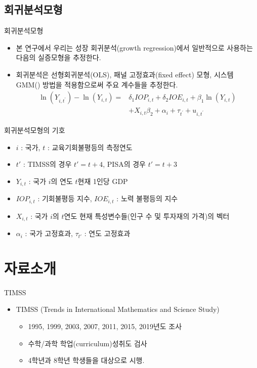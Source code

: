 \documentclass[handout, 10pt]{beamer}
\begin{document}
\subsection{회귀분석모형}
\begin{frame}{회귀분석모형}
   \begin{itemize}
       \item  본 연구에서 우리는 성장 회귀분석(growth regression)에서 일반적으로 사용하는 다음의 실증모형을 추정한다.
       \item 회귀분석은 선형회귀분석(OLS), 패널 고정효과(fixed effect) 모형, 시스템 GMM(\cite{bnb98}) 방법을 적용함으로써 주요 계수들을 추정한다.
       \begin{equation}
            \begin{aligned}
            \ln \left(Y_{i, t^{\prime}}\right)-\ln \left(Y_{i, t}\right)=& \delta_{1} I O P_{i, t}+\delta_{2} I O E_{i, t}+\beta_{1} \ln \left(Y_{i, t}\right) \\
            &+X_{i, t} \beta_{2} +\alpha_{i}+\tau_{t^{\prime}}+u_{i, t^{\prime}}
            \end{aligned}
            \label{eq:regbase}
       \end{equation} 
   \end{itemize} 
\end{frame}
 
\begin{frame}{회귀분석모형의 기호}
   \begin{itemize}
        \item $i$ : 국가, $t$ : 교육기회불평등의 측정연도
        \item $t'$ : TIMSS의 경우 $t'=t+4$, PISA의 경우  $t'=t+3$
        \item $Y_{i,t}$ : 국가 $i$의 연도 $t$현재 1인당 GDP
        \item $IOP_{i,t}$ : 기회불평등 지수, $IOE_{i,t}$ : 노력 불평등의 지수
        \item $X_{i,t}$ : 국가 $i$의 $t$연도 현재 특성변수들(인구 수 및 투자재의 가격)의 벡터 
        \item $\alpha _i$ : 국가 고정효과, $\tau _{t'}$ : 연도 고정효과
   \end{itemize} 
\end{frame}

\section{자료소개}
\begin{frame}{TIMSS}
    \begin{itemize}
        \item TIMSS (Trends in International Mathematics and Science Study)
        \begin{itemize}
            \item 1995, 1999, 2003, 2007, 2011, 2015, 2019년도 조사
            \item 수학/과학 학업(curriculum)성취도 검사
            \item 4학년과 8학년 학생들을 대상으로 시행.
        \end{itemize}
    \end{itemize}
\end{frame}
\end{document}
